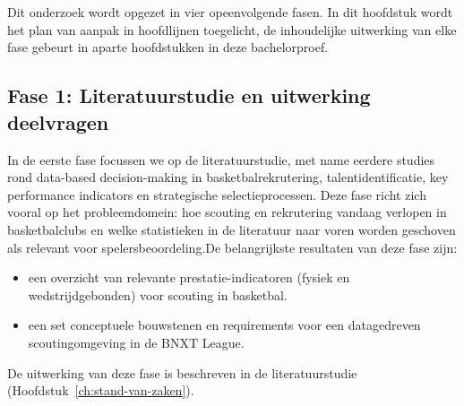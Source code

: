
\chapter{}%
\label{ch:methodologie}



Dit onderzoek wordt opgezet in vier opeenvolgende fasen. In dit hoofdstuk wordt het plan van aanpak in hoofdlijnen toegelicht, de inhoudelijke uitwerking van elke fase gebeurt in aparte hoofdstukken in deze bachelorproef.

\section{Fase 1: Literatuurstudie en uitwerking deelvragen}

In de eerste fase focussen we op de literatuurstudie, met name eerdere studies rond data-based decision-making in basketbalrekrutering, talentidentificatie, key performance indicators en strategische selectieprocessen. Deze fase richt zich vooral op het probleemdomein: hoe scouting en rekrutering vandaag verlopen in basketbalclubs en welke statistieken in de literatuur naar voren worden geschoven als relevant voor spelersbeoordeling.De belangrijkste resultaten van deze fase zijn:
\begin{itemize}
  \item een overzicht van relevante prestatie-indicatoren (fysiek en wedstrijdgebonden) voor scouting in basketbal.
  \item een set conceptuele bouwstenen en requirements voor een datagedreven scoutingomgeving in de BNXT League.
\end{itemize}
De uitwerking van deze fase is beschreven in de literatuurstudie (Hoofdstuk~\ref{ch:stand-van-zaken}).

